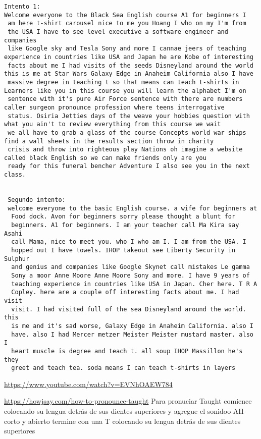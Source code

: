 \begin{verbatim}
Intento 1: 
Welcome everyone to the Black Sea English course A1 for beginners I
 am here t-shirt carousel nice to me you Hoang I who on my I'm from
 the USA I have to see level executive a software engineer and companies
 like Google sky and Tesla Sony and more I cannae jeers of teaching experience in countries like USA and Japan he are Kobe of interesting
 facts about me I had visits of the seeds Disneyland around the world this is me at Star Wars Galaxy Edge in Anaheim California also I have
 massive degree in teaching t so that means can teach t-shirts in Learners like you in this course you will learn the alphabet I'm on
 sentence with it's pure Air Force sentence with there are numbers caller surgeon pronounce profession where teens interrogative
 status. Osiria Jetties days of the weave your hobbies question with what you ain't to review everything from this course we wait
 we all have to grab a glass of the course Concepts world war ships find a wall sheets in the results section throw in charity
 crisis and throw into righteous play Nations oh imagine a website called black English so we can make friends only are you
 ready for this funeral bencher Adventure I also see you in the next class.
         
         
 Segundo intento: 
 welcome everyone to the basic English course. a wife for beginners at
  Food dock. Avon for beginners sorry please thought a blunt for 
  beginners. A1 for beginners. I am your teacher call Ma Kira say Asahi 
  call Mama, nice to meet you. who I who am I. I am from the USA. I 
  hopped out I have towels. IHOP takeout see Liberty Security in Sulphur 
  and genius and companies like Google Skynet call mistakes Le gamma 
  Sony a moor Anne Moore Anne Moore Sony and more. I have 9 years of 
  teaching experience in countries like USA in Japan. Cher here. T R A 
  Copley. here are a couple off interesting facts about me. I had visit 
  visit. I had visited full of the sea Disneyland around the world. this 
  is me and it's sad worse, Galaxy Edge in Anaheim California. also I 
  have. also I had Mercer metzer Meister Meister mustard master. also I 
  heart muscle is degree and teach t. all soup IHOP Massillon he's they 
  greet and teach tea. soda means I can teach t-shirts in layers
\end{verbatim} 

\url{https://www.youtube.com/watch?v=EVNhOAEW784}

\url{https://howjsay.com/how-to-pronounce-taught}
Para pronuciar Taught comience colocando su lengua detr\'as de sus dientes superiores y agregue el sonidoo AH corto y abierto termine con una T colocando su lengua detr\'as de sus dientes superiores



